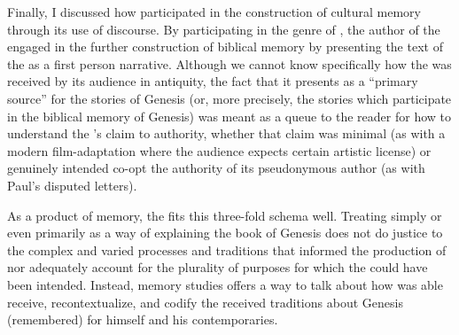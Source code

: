 Finally, I discussed how \ga participated in the construction of cultural memory through its use of \psgraphical discourse. By participating in the genre of \psy, the author of the \ga engaged in the further construction of biblical memory by presenting the text of the \ga as a first person narrative. Although we cannot know specifically how the \ga was received by its audience in antiquity, the fact that it presents as a ``primary source'' for the stories of Genesis (or, more precisely, the stories which participate in the biblical memory of Genesis) was meant as a queue to the reader for how to understand the \ga's claim to authority, whether that claim was minimal (as with a modern film-adaptation where the audience expects certain artistic license) or genuinely intended co-opt the authority of its pseudonymous author (as with Paul's disputed letters).

As a product of memory, the \ga fits this three-fold schema well. Treating \ga simply or even primarily as a way of explaining the book of Genesis does not do justice to the complex and varied processes and traditions that informed the production of \ga nor adequately account for the plurality of purposes for which the \ga could have been intended. Instead, memory studies offers a way to talk about how \ga was able receive, recontextualize, and codify the received traditions about Genesis (remembered) for himself and his contemporaries.


